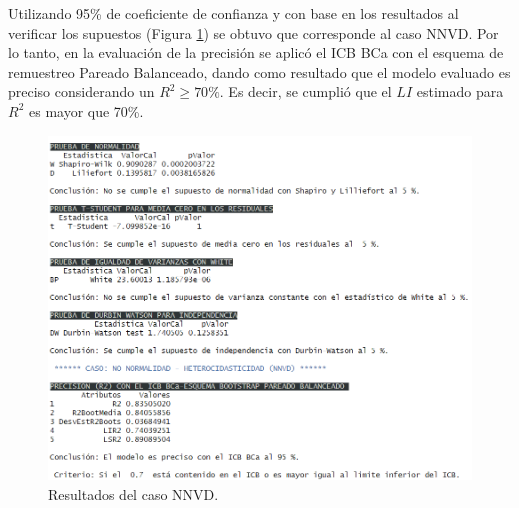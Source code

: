 Utilizando 95\% de coeficiente de confianza y con base en los resultados al verificar los supuestos (Figura \ref{fig:final_NNVD_resultados}) se obtuvo que corresponde al caso NNVD. Por lo tanto, en la evaluación de la precisión se aplicó el ICB BCa con el esquema de remuestreo Pareado Balanceado, dando como resultado que el modelo evaluado es preciso considerando un $R^2 \geq 70\%$. Es decir, se cumplió que el $LI$ estimado
para $R^2$ es mayor que 70\%.

\begin{figure}[ht!]
	\centering 
	\includegraphics[width=0.9\linewidth]{img/Uso_NNVD_PropuestaFinal.png} 
	\caption{Resultados del caso NNVD.}
	\label{fig:final_NNVD_resultados}
\end{figure}

\FloatBarrier %
\clearpage
